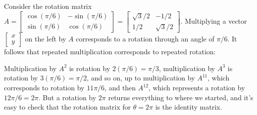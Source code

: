 \documentclass[12pt]{article}
\newcommand{\bbm}{\begin{bmatrix}}
\newcommand{\ebm}{\end{bmatrix}}
\begin{document}
\begin{enumerate}
\bigskip

Consider the rotation matrix $A = \bbm \cos(\pi/6) & -\sin(\pi/6)\\\sin(\pi/6) & \cos(\pi/6)\ebm = \bbm \sqrt{3}/2 & -1/2\\1/2 & \sqrt{3}/2\ebm$.
Multiplying a vector $\bbm x\\y\ebm$ on the left by $A$ corresponds to a rotation through an angle of $\pi/6$. It follows that repeated multiplication corresponds to repeated rotation:

Multiplication by $A^2$ is rotation by $2(\pi/6)=\pi/3$, multiplication by $A^3$ is rotation by $3(\pi/6) = \pi/2$, and so on, up to multiplication by $A^{11}$, which corresponds to rotation by $11\pi/6$, and then $A^{12}$, which represents a rotation by $12\pi/6 = 2\pi$. But a rotation by $2\pi$ returns everything to where we started, and it's easy to check that the rotation matrix for $\theta = 2\pi$ is the identity matrix.
 \end{enumerate}
\end{document}
